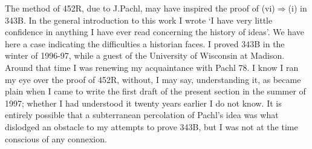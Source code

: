 {The method of 452R, due to J.Pachl, may have inspired the proof of
(vi)$\Rightarrow$(i) in 343B.   In the general introduction to this work
I wrote `I have very little confidence in anything I have ever read
concerning the history of ideas'.   We have here a case indicating the
difficulties a historian faces.   I
proved 343B in the winter of 1996-97, while a guest of the University of
Wisconsin at Madison.   Around that time I was renewing my acquaintance
with {\smc Pachl 78}.   I know I ran my eye over the proof of 452R,
without, I may say, understanding it, as became plain when I came to
write the first draft of the present section in the summer of 1997;
whether I had
understood it twenty years earlier I do not know.   It is entirely
possible that a subterranean percolation of Pachl's idea was what
dislodged an obstacle to my attempts to prove 343B, but I was not at the
time conscious of any connexion.
}%

\discrpage

